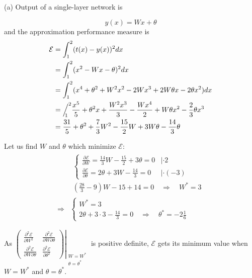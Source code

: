 \begin{enumerate}
  \begin{solution}

    (a) Output of a single-layer network is

    \begin{equation*}
      y(x)=Wx+\theta
    \end{equation*}
    and the approximation performance measure is
    \begin{align*}
      \mathcal{E}&=\int_1^2(t(x)-y(x))^2 dx
      \\
      &= \int_1^2 (x^2-Wx-\theta)^2dx
      \\
      &=\int_1^2 (x^4+\theta^2 +W^2x^2-2Wx^3+2W\theta x-2\theta x^2)dx
      \\
      &=\Big/^2_{\mspace{-11.0mu} 1} \frac{x^5}{5}
      +\theta^2x+\frac{W^2x^3}{3}-\frac{Wx^4}{2}+W\theta
      x^2-\frac{2}{3}\theta x^3
      \\
      &=\frac{31}{5}+\theta^2
      +\frac{7}{3}W^2-\frac{15}{2}W+3W\theta-\frac{14}{3}\theta
    \end{align*}

    Let us find $W$ and $\theta$ which minimize $\mathcal{E}$:
    \begin{align*}
      &
      \begin{array}{l}
        \begin{cases}
          \frac{\partial\mathcal{E}}{\partial
            W}=\frac{14}{3}W-\frac{15}{2}+3\theta = 0 & | \cdot 2
          \\
          \frac{\partial\mathcal{E}}{\partial
            \theta}=2\theta+3W -\frac{14}{3} = 0 & | \cdot (-3)
        \end{cases}
        \\
        \hline
        (\frac{28}{3}-9)W - 15 + 14 = 0 \quad \Rightarrow \quad W^*=3
      \end{array}
      \\
      \Rightarrow &
      \begin{cases}
        W^* = 3
        \\
        2\theta+3\cdot 3 -\frac{14}{3} = 0 \quad \Rightarrow \quad \theta^* =
        -2\frac{1}{6}
      \end{cases}
    \end{align*}

    As $\left.\begin{pmatrix} \frac{\partial^2\mathcal{E}}{\partial W^2} &
        \frac{\partial^2\mathcal{E}}{\partial W \partial\theta}\\
        \frac{\partial^2\mathcal{E}}{\partial W \partial\theta} &
        \frac{\partial^2\mathcal{E}}{\partial\theta^2}
      \end{pmatrix}\right|_{\begin{array}{l}\scriptstyle  W=W^*\\\theta=\theta^*\end{array}}$
    is positive definite, $\mathcal{E}$ gets its minimum value when
    $W=W^*$ and $\theta=\theta^*$.


\end{solution}
\end{enumerate}
